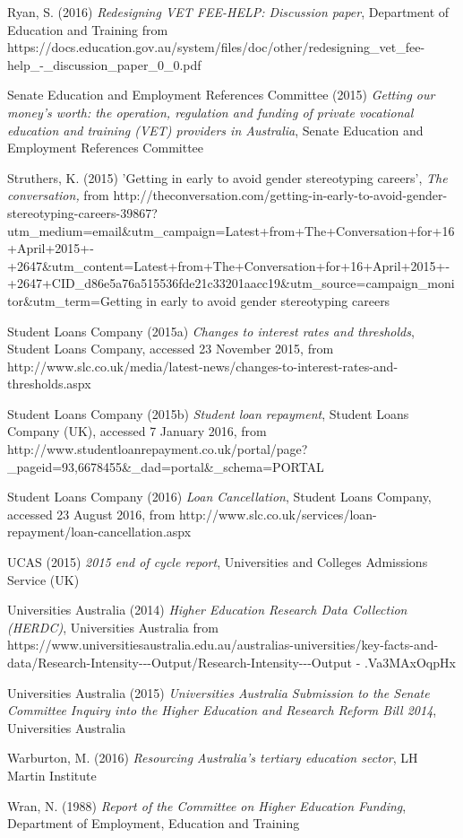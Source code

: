\documentclass[]{book}
\begin{document}
\protect\hypertarget{_ENREF_71}{}{}Ryan, S. (2016) \emph{Redesigning VET FEE-HELP: Discussion paper}, Department of Education and Training from https://docs.education.gov.au/system/files/doc/other/redesigning\_vet\_fee-help\_-\_discussion\_paper\_0\_0.pdf

\protect\hypertarget{_ENREF_72}{}{}Senate Education and Employment References Committee (2015) \emph{Getting our money's worth: the operation, regulation and funding of private vocational education and training (VET) providers in Australia}, Senate Education and Employment References Committee

\protect\hypertarget{_ENREF_73}{}{}Struthers, K. (2015) 'Getting in early to avoid gender stereotyping careers', \emph{The conversation,} from http://theconversation.com/getting-in-early-to-avoid-gender-stereotyping-careers-39867?utm\_medium=email\&utm\_campaign=Latest+from+The+Conversation+for+16+April+2015+-+2647\&utm\_content=Latest+from+The+Conversation+for+16+April+2015+-+2647+CID\_d86e5a76a515536fde21c33201aacc19\&utm\_source=campaign\_monitor\&utm\_term=Getting in early to avoid gender stereotyping careers

\protect\hypertarget{_ENREF_74}{}{}Student Loans Company (2015a) \emph{Changes to interest rates and thresholds}, Student Loans Company, accessed 23 November 2015, from http://www.slc.co.uk/media/latest-news/changes-to-interest-rates-and-thresholds.aspx

\protect\hypertarget{_ENREF_75}{}{}Student Loans Company (2015b) \emph{Student loan repayment}, Student Loans Company (UK), accessed 7 January 2016, from http://www.studentloanrepayment.co.uk/portal/page?\_pageid=93,6678455\&\_dad=portal\&\_schema=PORTAL

\protect\hypertarget{_ENREF_76}{}{}Student Loans Company (2016) \emph{Loan Cancellation}, Student Loans Company, accessed 23 August 2016, from http://www.slc.co.uk/services/loan-repayment/loan-cancellation.aspx

\protect\hypertarget{_ENREF_77}{}{}UCAS (2015) \emph{2015 end of cycle report}, Universities and Colleges Admissions Service (UK)

\protect\hypertarget{_ENREF_78}{}{}Universities Australia (2014) \emph{Higher Education Research Data Collection (HERDC)}, Universities Australia from https://www.universitiesaustralia.edu.au/australias-universities/key-facts-and-data/Research-Intensity-\/-\/-Output/Research-Intensity-\/-\/-Output - .Va3MAxOqpHx

\protect\hypertarget{_ENREF_79}{}{}Universities Australia (2015) \emph{Universities Australia Submission to the Senate Committee Inquiry into the Higher Education and Research Reform Bill 2014}, Universities Australia

\protect\hypertarget{_ENREF_80}{}{}Warburton, M. (2016) \emph{Resourcing Australia's tertiary education sector}, LH Martin Institute

\protect\hypertarget{_ENREF_81}{}{}Wran, N. (1988) \emph{Report of the Committee on Higher Education Funding}, Department of Employment, Education and Training
\end{document}
